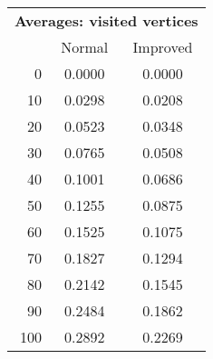 \begin{tabular}{r|cc}
      \multicolumn{3}{c}{{\bf Averages: visited vertices }} \\
      & Normal & Improved \\ \hline\hline
0
& 0.0000
& 0.0000
\\
10
& 0.0298
& 0.0208
\\
20
& 0.0523
& 0.0348
\\
30
& 0.0765
& 0.0508
\\
40
& 0.1001
& 0.0686
\\
50
& 0.1255
& 0.0875
\\
60
& 0.1525
& 0.1075
\\
70
& 0.1827
& 0.1294
\\
80
& 0.2142
& 0.1545
\\
90
& 0.2484
& 0.1862
\\
100
& 0.2892
& 0.2269
\\
\end{tabular}
